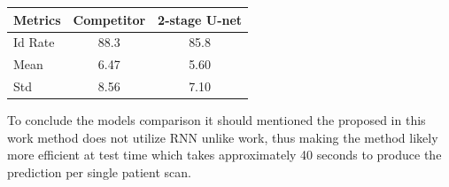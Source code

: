 \begin{table}[htbp]
\centering
\begin{tabular}{|l||c|c|} \hline\hline
Metrics & Competitor & 2-stage U-net \\ \hline
Id Rate & 88.3 & 85.8 \\
Mean & 6.47 & 5.60 \\
Std & 8.56 & 7.10 \\
\hline\hline
\end{tabular}
\end{table}

To conclude the models comparison it should mentioned the proposed in this work method does not utilize RNN unlike \cite{Liao2018} work, thus making the method likely more efficient at test time which takes approximately 40 seconds to produce the prediction per single patient scan. 